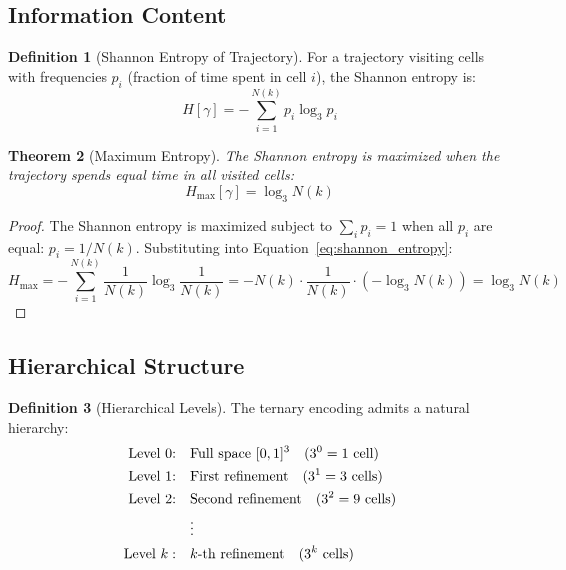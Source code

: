 \documentclass[11pt,twocolumn,a4paper]{article}
\newtheorem{theorem}{Theorem}[section]
\theoremstyle{definition}
\newtheorem{definition}[theorem]{Definition}
\theoremstyle{remark}
\begin{document}
\subsection{Information Content}

\begin{definition}[Shannon Entropy of Trajectory]
\label{def:shannon_entropy_trajectory}
For a trajectory visiting cells with frequencies $p_i$ (fraction of time spent in cell $i$), the Shannon entropy is:
\begin{equation}
H[\gamma] = -\sum_{i=1}^{N(k)} p_i \log_3 p_i
\label{eq:shannon_entropy}
\end{equation}
\end{definition}

\begin{theorem}[Maximum Entropy]
\label{thm:maximum_entropy}
The Shannon entropy is maximized when the trajectory spends equal time in all visited cells:
\begin{equation}
H_{\max}[\gamma] = \log_3 N(k)
\label{eq:maximum_entropy}
\end{equation}
\end{theorem}

\begin{proof}
The Shannon entropy is maximized subject to $\sum_i p_i = 1$ when all $p_i$ are equal: $p_i = 1/N(k)$. Substituting into Equation~\eqref{eq:shannon_entropy}:
\begin{equation}
H_{\max} = -\sum_{i=1}^{N(k)} \frac{1}{N(k)} \log_3 \frac{1}{N(k)} = -N(k) \cdot \frac{1}{N(k)} \cdot (-\log_3 N(k)) = \log_3 N(k)
\end{equation}
\end{proof}

\subsection{Hierarchical Structure}

\begin{definition}[Hierarchical Levels]
\label{def:hierarchical_levels}
The ternary encoding admits a natural hierarchy:
\begin{align}
\text{Level 0:} \quad &\text{Full space } [0,1]^3 \quad (3^0 = 1 \text{ cell}) \label{eq:level_0} \\
\text{Level 1:} \quad &\text{First refinement} \quad (3^1 = 3 \text{ cells}) \label{eq:level_1} \\
\text{Level 2:} \quad &\text{Second refinement} \quad (3^2 = 9 \text{ cells}) \label{eq:level_2} \\
&\vdots \notag \\
\text{Level } k: \quad &k\text{-th refinement} \quad (3^k \text{ cells}) \label{eq:level_k}
\end{align}
\end{definition}
\end{document}
